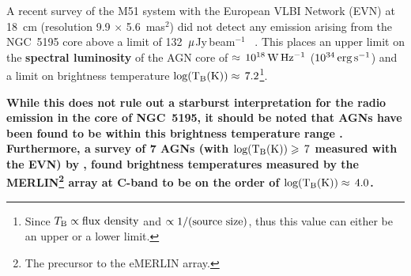 \documentclass[fleqn,usenatbib]{mnras}
\def\mujybm   {${\rm \mu}$Jy\,beam$^{-1}$}
\begin{document}
A recent survey of the M51 system with the European VLBI Network (EVN) at 18~cm (resolution 9.9 $\times$ 5.6~mas$^{2}$) did not detect any emission arising from 
the NGC~5195 core above a limit of 132~\mujybm~ \citep{Rampadarathetal15}. This places an upper 
limit on the \textbf{spectral luminosity} of the AGN core of $\approx\,10^{18}\,{\rm W\,Hz^{-1}}$ 
($10^{34}\,{\rm erg\,s^{-1}}$) and a limit on brightness temperature ${\rm log(T_{B} (K))}\approx\,7.2$\footnote{Since $T_{\rm B} \propto {\rm flux~density}$ and $\propto {\rm 1/(source~size)}$, thus this value can either be an upper or a lower limit.}.  

\textbf{While this does not rule out a starburst interpretation for the radio emission in the core of NGC~5195, it should be noted that AGNs have been found to be within this brightness temperature range \citep{Garrett2001}. Furthermore, a survey of 7 AGNs (with ${\rm log(T_{B} (K))}\geq\,7$ measured with the EVN) by \cite{Krips+2007}, found brightness temperatures measured by the MERLIN\footnote{The precursor to the eMERLIN array.}  array at C-band to be on the order of ${\rm log(T_{B} (K))}\approx\,4.0$.}
\end{document}
